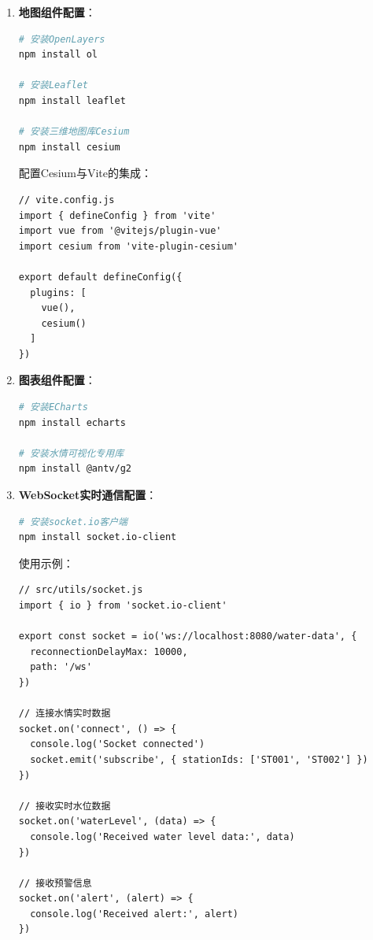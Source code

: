 \begin{enumerate}
\def\labelenumi{\arabic{enumi}.}
\item
  \textbf{地图组件配置}：

\begin{lstlisting}[language=bash]
# 安装OpenLayers
npm install ol

# 安装Leaflet
npm install leaflet

# 安装三维地图库Cesium
npm install cesium
\end{lstlisting}

  配置Cesium与Vite的集成：

\begin{lstlisting}
// vite.config.js
import { defineConfig } from 'vite'
import vue from '@vitejs/plugin-vue'
import cesium from 'vite-plugin-cesium'

export default defineConfig({
  plugins: [
    vue(),
    cesium()
  ]
})
\end{lstlisting}
\item
  \textbf{图表组件配置}：

\begin{lstlisting}[language=bash]
# 安装ECharts
npm install echarts

# 安装水情可视化专用库
npm install @antv/g2
\end{lstlisting}
\item
  \textbf{WebSocket实时通信配置}：

\begin{lstlisting}[language=bash]
# 安装socket.io客户端
npm install socket.io-client
\end{lstlisting}

  使用示例：

\begin{lstlisting}
// src/utils/socket.js
import { io } from 'socket.io-client'

export const socket = io('ws://localhost:8080/water-data', {
  reconnectionDelayMax: 10000,
  path: '/ws'
})

// 连接水情实时数据
socket.on('connect', () => {
  console.log('Socket connected')
  socket.emit('subscribe', { stationIds: ['ST001', 'ST002'] })
})

// 接收实时水位数据
socket.on('waterLevel', (data) => {
  console.log('Received water level data:', data)
})

// 接收预警信息
socket.on('alert', (alert) => {
  console.log('Received alert:', alert)
})
\end{lstlisting}
\end{enumerate}

